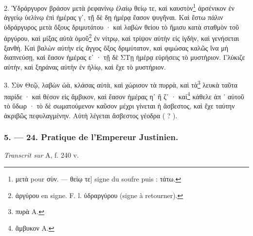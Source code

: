 \documentclass[a4paper, 11pt, oneside, polutonikogreek, french]{article}
\begin{document}
2. Ὑδράργυρον βράσον μετὰ ῥεφανίνῳ ἐλαίῳ θείῳ τε, καὶ καυστὸν\footnote{μετὰ pour σὺν. --- θείῳ τε] signe du soufre puis : τάτω.} ἀρσένικον ἐν ἀγγείῳ ὑελίνῳ ἐπὶ ἡμέρας γʹ, τῇ δὲ δῃ ἡμέρᾳ ἔασον ψυγῆναι. Καὶ ἔστω πάλιν ὑδράργυρος μετὰ ὄξους δριμυτάτου · καὶ λαβὼν θείου τὸ ἥμισυ κατὰ σταθμὸν τοῦ ἀργύρου, καὶ μίξας αὐτὰ ὁμοῦ\footnote{ἀργύρου en signe. F. l. ὑδραργύρου (signe à retourner).} ἐν νίτρῳ, καὶ τρίψον αὐτὴν εἰς ἰγδὴν, καὶ γενήσεται ξανθή. Καὶ βαλὼν αὐτὴν εἰς ἄγγος ὄξος δριμύτατον, καὶ φιμώσας καλῶς ἵνα μὴ διαπνεύσῃ, καὶ ἔασον ἡμέρας εʹ · τῇ δὲ ΣΤῃ ἡμέρᾳ εὑρήσεις τὸ μυστήριον. Γλύκιζε αὐτὴν, καὶ ξηράνας αὐτὴν ἐν ἡλίῳ, καὶ ἔχε τὸ μυστήριον.

3. Σὺν Θεῷ, λαβὼν ὠὰ, κλάσας αὐτὰ, καὶ χώρισον τὰ πυρρὰ, καὶ τὰ\footnote{πυρὰ A.} λευκὰ ταῦτα παρίδε · καὶ θέσον εἰς ἄμβικον, καὶ ἔασον ἡμέρας ηʹ ἢ ζʹ · καὶ\footnote{ἄμβυκον A.} κάθελε ἀπ ᾽ αὐτοῦ τὸ ὕδωρ · τὸ δὲ σωματούμενον καῦσον μέχρι γίνεται ἡ ἄσβεστος, καὶ ἔχε ταύτην ἀκριβῶς πεφυλαγμένην. Αὐτὴ λέγεται ἄσβεστος γέοδρα ( ? ).

\bigskip
\centerline{\EightStarTaper}
\centerline{\EightStarTaper\EightStarTaper}
\bigskip

\subsubsection{5. --- 24. Pratique de l'Empereur Justinien.}

\emph{Transcrit sur} A, f. 240 v.

\bigskip
\end{document}
